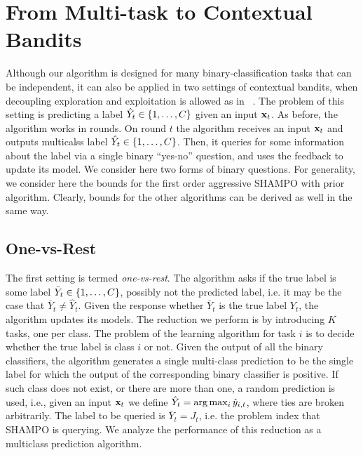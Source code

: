 \chapter{From Multi-task to Contextual Bandits}\label{chap:multiclass}
Although our algorithm is designed for many binary-classification tasks that can be independent, 
it can also be applied in two settings of contextual bandits, when decoupling exploration and 
exploitation is allowed as in ~\cite{DBLP:conf/icml/YuM09,DBLP:conf/icml/AvnerMS12}. 
The problem of this setting is predicting a label $\hat{Y}_t \in\{ 1 , \ldots , C\}$ given an input $\mathbf{x}_{t}$. 
As before, the algorithm works in rounds. On round $t$ the algorithm receives an input $\mathbf{x}_{t}$ and 
outputs  multicalss label $\hat{Y}_t\in\{1 , \ldots , C\}$. 
Then, it queries for some information about the label via a single binary ``yes-no'' question, and uses the 
feedback to update its model. We consider here two forms of binary questions. For generality, we consider 
here the bounds for  the first order aggressive SHAMPO with prior algorithm. 
Clearly, bounds for the other algorithms can be derived as well in the same way.

\section{One-vs-Rest}
The first setting is termed {\em one-vs-rest}. The algorithm asks if the true label is some label 
$\bar{Y}_t\in\{ 1 , \ldots , C\}$, possibly not the predicted label, i.e. it may be the case that 
$\bar{Y}_t \neq\hat{Y}_t$. Given the response whether  $\bar{Y}_t$ is the true label $Y_t$, the algorithm 
updates its models. The reduction we perform is by introducing $K$ tasks, one per class. 
The problem of the learning algorithm for task $i$ is to decide whether the true label is class $i$ or not. 
Given the output of all the binary classifiers, the algorithm generates a single multi-class prediction to be the 
single label for which the output of the corresponding binary classifier is positive. If such class does not 
exist, or there are more than one, a random prediction is used, i.e., given an input $\mathbf{x}_{t}$ 
we define $\hat{Y}_t = \arg\max_i \hat{y}_{i,t}$, where ties are broken arbitrarily. The label to be queried is 
$\bar{Y}_t=J_t$, i.e. the problem index that SHAMPO is querying. We analyze the performance of this 
reduction as a multiclass prediction algorithm.

